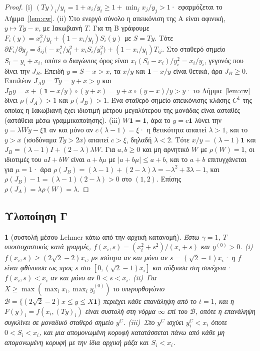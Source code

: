 \documentclass[11pt,a4paper]{article}
\theoremstyle{definition}
\theoremstyle{plain}
\newcommand{\genpropname}{}
\newtheorem*{genprop}{\genpropname}
\newenvironment{prop}[1]{\renewcommand{\genpropname}{Πρόταση #1}\begin{genprop}}{\end{genprop}}
\newcommand{\one}{\mathbf{1}}
\begin{document}
\begin{proof}
(i) $(Ty)_i/y_i=1+x_i/y_i\ge1+\min_jx_j/y_j>1$· εφαρμόζεται το Λήμμα~\ref{lem:cw}. (ii) Στο ενεργό σύνολο η απεικόνιση της Α είναι αφινική, $y\mapsto Ty-x$, με Ιακωβιανή $T$. Για τη Β γράφουμε $F_i(y)=x_i^2/y_i+(1-x_i/y_i)S_i(y)$ με $S=Ty$. Τότε $\partial F_i/\partial y_j=\delta_{ij}\big(-x_i^2/y_i^2+x_iS_i/y_i^2\big)+(1-x_i/y_i)T_{ij}$. Στο σταθερό σημείο $S_i=y_i+x_i$, οπότε ο διαγώνιος όρος είναι $x_i(S_i-x_i)/y_i^2=x_i/y_i$, γεγονός που δίνει την $J_B$. Επειδή $y=S-x>x$, τα $x/y$ και $\one-x/y$ είναι θετικά, άρα $J_B\ge0$. Επιπλέον $J_Ay=Ty=y+x>y$ και $J_By=x+(\one-x/y)\circ(y+x)=y+x\circ(y-x)/y>y$· το Λήμμα~\ref{lem:cw} δίνει $\rho(J_A)>1$ και $\rho(J_B)>1$. Ένα σταθερό σημείο απεικόνισης κλάσης $C^1$ της οποίας η Ιακωβιανή έχει ιδιοτιμή μέτρου μεγαλύτερου της μονάδας είναι ασταθές (αστάθεια μέσω γραμμικοποίησης). (iii) $W\one=\one$, άρα το $y=c\one$ λύνει την $y=\lambda Wy-\xi\one$ αν και μόνο αν $c(\lambda-1)=\xi$· η θετικότητα απαιτεί $\lambda>1$, και το $y>x$ (ισοδύναμα $Ty>2x$) απαιτεί $c>\xi$, δηλαδή $\lambda<2$. Τότε $x/y=(\lambda-1)\one$ και $J_B=(\lambda-1)I+(2-\lambda)\lambda W$. Για $a,b\ge0$ και μη αρνητικό $W$ με $\rho(W)=1$, οι ιδιοτιμές του $aI+bW$ είναι $a+b\mu$ με $|a+b\mu|\le a+b$, και το $a+b$ επιτυγχάνεται για $\mu=1$· άρα $\rho(J_B)=(\lambda-1)+(2-\lambda)\lambda=-\lambda^2+3\lambda-1$, και $\rho(J_B)-1=(\lambda-1)(2-\lambda)>0$ στο $(1,2)$. Επίσης $\rho(J_A)=\lambda\rho(W)=\lambda$.
\end{proof}

\subsection{Υλοποίηση Γ}

\begin{prop}{D}[συστολή μέσου Lehmer κάτω από την αρχική κατανομή]
Έστω $\gamma=1$, $T$ υποστοχαστικός κατά γραμμές, $f(x_i,s)=(x_i^2+s^2)/(x_i+s)$ και $y^{(0)}>0$. (i)~$f(x_i,s)\ge(2\sqrt2-2)x_i$, με ισότητα αν και μόνο αν $s=(\sqrt2-1)x_i$· η $f$ είναι φθίνουσα ως προς $s$ στο $[0,(\sqrt2-1)x_i]$ και αύξουσα στη συνέχεια· $f(x_i,s)<x_i$ αν και μόνο αν $0<s<x_i$. (ii)~Για $X\ge\max(\max_ix_i,\max_iy_i^{(0)})$ το υπερορθογώνιο $\mathcal B=\{(2\sqrt2-2)x\le y\le X\one\}$ περιέχει κάθε επανάληψη από το $t=1$, και η $F(y)_i=f(x_i,(Ty)_i)$ είναι συστολή στη νόρμα $\infty$ επί του $\mathcal B$, οπότε η επανάληψη συγκλίνει σε μοναδικό σταθερό σημείο $y^C$. (iii)~Στο $y^C$ ισχύει $y^C_i<x_i$ όποτε $0<S_i<x_i$, και μια απομονωμένη κορυφή κατατάσσεται πάνω από κάθε μη απομονωμένη κορυφή με την ίδια αρχική μάζα και $S_i<x_i$.
\end{prop}
\end{document}
